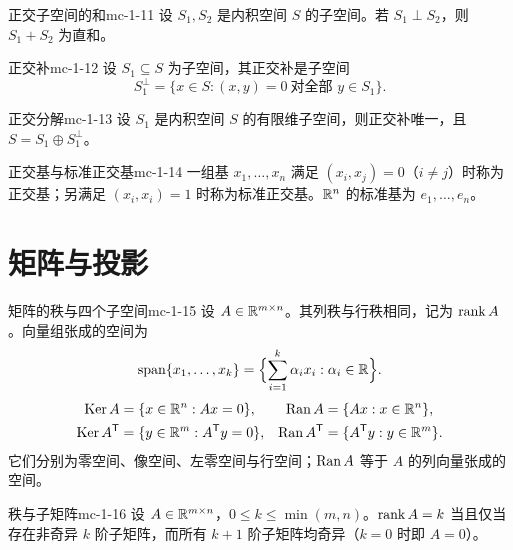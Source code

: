 \begin{theorem}{正交子空间的和}{mc-1-11}
设 $S_1,S_2$ 是内积空间 $S$ 的子空间。若 $S_1\perp S_2$，则 $S_1+S_2$ 为直和。
\end{theorem}

\begin{definition}{正交补}{mc-1-12}
设 $S_1\subseteq S$ 为子空间，其正交补是子空间
\[S_1^\perp=\{x\in S:(x,y)=0\ \text{对全部 }y\in S_1\}.\]
\end{definition}

\begin{theorem}{正交分解}{mc-1-13}
设 $S_1$ 是内积空间 $S$ 的有限维子空间，则正交补唯一，且 $S=S_1\oplus S_1^\perp$。
\end{theorem}

\begin{definition}{正交基与标准正交基}{mc-1-14}
一组基 $x_1,\ldots,x_n$ 满足 $(x_i,x_j)=0$（$i\ne j$）时称为正交基；另满足 $(x_i,x_i)=1$ 时称为标准正交基。$\mathbb{R}^n$ 的标准基为 $e_1,\ldots,e_n$。
\end{definition}

\section{矩阵与投影}

\begin{definition}{矩阵的秩与四个子空间}{mc-1-15}
设 $A\in\mathbb{R}^{m\times n}$。其列秩与行秩相同，记为 $\operatorname{rank} A$。向量组张成的空间为
\[\operatorname{span}\{x_1,\ldots,x_k\}=\Bigl\{\sum_{i=1}^k\alpha_ix_i:\alpha_i\in\mathbb{R}\Bigr\}.\]
\[
\begin{aligned}
\operatorname{Ker} A&=\{x\in\mathbb{R}^n:Ax=0\},&\operatorname{Ran} A&=\{Ax:x\in\mathbb{R}^n\},\\
\operatorname{Ker} A^{\mathsf T}&=\{y\in\mathbb{R}^m:A^{\mathsf T}y=0\},&\operatorname{Ran} A^{\mathsf T}&=\{A^{\mathsf T}y:y\in\mathbb{R}^m\}.
\end{aligned}
\]
它们分别为零空间、像空间、左零空间与行空间；$\operatorname{Ran} A$ 等于 $A$ 的列向量张成的空间。
\end{definition}

\begin{theorem}{秩与子矩阵}{mc-1-16}
设 $A\in\mathbb{R}^{m\times n}$，$0\leq k\leq\min(m,n)$。$\operatorname{rank} A=k$ 当且仅当存在非奇异 $k$ 阶子矩阵，而所有 $k+1$ 阶子矩阵均奇异（$k=0$ 时即 $A=0$）。
\end{theorem}

